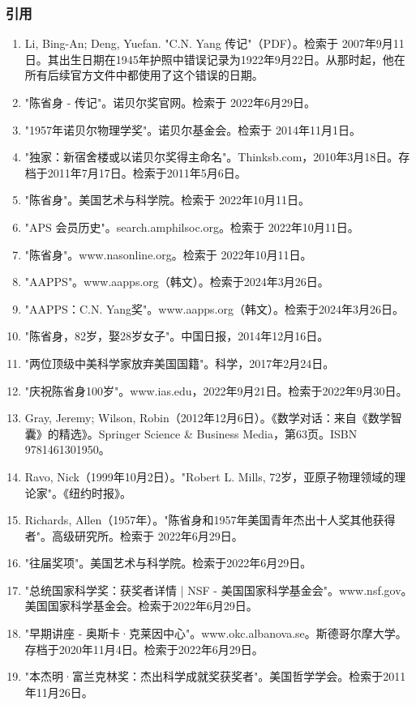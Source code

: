 \subsubsection{引用}
\begin{enumerate}
\item Li, Bing-An; Deng, Yuefan. "C.N. Yang 传记"（PDF）。检索于 2007年9月11日。其出生日期在1945年护照中错误记录为1922年9月22日。从那时起，他在所有后续官方文件中都使用了这个错误的日期。  
\item "陈省身 - 传记"。诺贝尔奖官网。检索于 2022年6月29日。  
\item "1957年诺贝尔物理学奖"。诺贝尔基金会。检索于 2014年11月1日。  
\item "独家：新宿舍楼或以诺贝尔奖得主命名"。Thinksb.com，2010年3月18日。存档于2011年7月17日。检索于2011年5月6日。  
\item "陈省身"。美国艺术与科学院。检索于 2022年10月11日。  
\item "APS 会员历史"。search.amphilsoc.org。检索于 2022年10月11日。  
\item "陈省身"。www.nasonline.org。检索于 2022年10月11日。  
\item "AAPPS"。www.aapps.org（韩文）。检索于2024年3月26日。  
\item "AAPPS：C.N. Yang奖"。www.aapps.org（韩文）。检索于2024年3月26日。  
\item "陈省身，82岁，娶28岁女子"。中国日报，2014年12月16日。  
\item "两位顶级中美科学家放弃美国国籍"。科学，2017年2月24日。  
\item "庆祝陈省身100岁"。www.ias.edu，2022年9月21日。检索于2022年9月30日。  
\item Gray, Jeremy; Wilson, Robin（2012年12月6日）。《数学对话：来自《数学智囊》的精选》。Springer Science & Business Media，第63页。ISBN 9781461301950。  
\item Ravo, Nick（1999年10月2日）。"Robert L. Mills, 72岁，亚原子物理领域的理论家"。《纽约时报》。  
\item Richards, Allen（1957年）。"陈省身和1957年美国青年杰出十人奖其他获得者"。高级研究所。检索于 2022年6月29日。
\item "往届奖项"。美国艺术与科学院。检索于2022年6月29日。  
\item "总统国家科学奖：获奖者详情 | NSF - 美国国家科学基金会"。www.nsf.gov。美国国家科学基金会。检索于2022年6月29日。  
\item "早期讲座 - 奥斯卡·克莱因中心"。www.okc.albanova.se。斯德哥尔摩大学。存档于2020年11月4日。检索于2022年6月29日。  
\item "本杰明·富兰克林奖：杰出科学成就奖获奖者"。美国哲学学会。检索于2011年11月26日。  

\end{enumerate}
